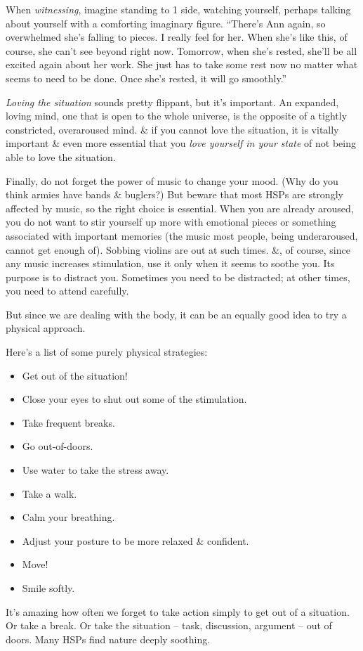 \documentclass{article}
\numberwithin{equation}{section}
\begin{document}
When \textit{witnessing}, imagine standing to 1 side, watching yourself, perhaps talking about yourself with a comforting imaginary figure. ``There's Ann again, so overwhelmed she's falling to pieces. I really feel for her. When she's like this, of course, she can't see beyond right now. Tomorrow, when she's rested, she'll be all excited again about her work. She just has to take some rest now no matter what seems to need to be done. Once she's rested, it will go smoothly.''

\textit{Loving the situation} sounds pretty flippant, but it's important. An expanded, loving mind, one that is open to the whole universe, is the opposite of a tightly constricted, overaroused mind. \& if you cannot love the situation, it is vitally important \& even more essential that you \textit{love yourself in your state} of not being able to love the situation.

Finally, do not forget the power of music to change your mood. (Why do you think armies have bands \& buglers?) But beware that most HSPs are strongly affected by music, so the right choice is essential. When you are already aroused, you do not want to stir yourself up more with emotional pieces or something associated with important memories (the music most people, being underaroused, cannot get enough of). Sobbing violins are out at such times. \&, of course, since any music increases stimulation, use it only when it seems to soothe you. Its purpose is to distract you. Sometimes you need to be distracted; at other times, you need to attend carefully.

But since we are dealing with the body, it can be an equally good idea to try a physical approach.

Here's a list of some purely physical strategies:
\begin{itemize}
	\item Get out of the situation!
	\item Close your eyes to shut out some of the stimulation.
	\item Take frequent breaks.
	\item Go out-of-doors.
	\item Use water to take the stress away.
	\item Take a walk.
	\item Calm your breathing.
	\item Adjust your posture to be more relaxed \& confident.
	\item Move!
	\item Smile softly.
\end{itemize}
It's amazing how often we forget to take action simply to get out of a situation. Or take a break. Or take the situation -- task, discussion, argument -- out of doors. Many HSPs find nature deeply soothing.
\end{document}
